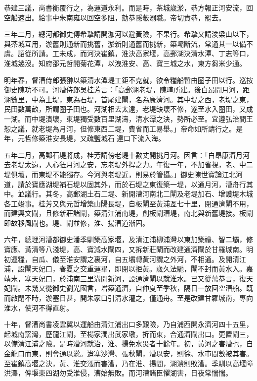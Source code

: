 恭建三議，尚書衡覆行之，為運道永利。而是時，茶城歲淤，恭方報正河安流，回空船速出。給事中朱南雍以回空多阻，劾恭隱蔽溺職。帝切責恭，罷去。

三年二月，總河都御史傅希摯請開泇河以避黃險，不果行。希摯又請浚梁山以下，與茶城互用，淤舊則通新而挑舊，淤新則通舊而挑新，築壩斷流，常通其一以備不虞。詔從所請。工未成，而河決崔鎮，淮決高家堰，高郵湖決清水潭、丁志等口，淮城幾沒。知府邵元哲開菊花潭，以洩淮安、高、寶三城之水，東方芻米少通。

明年春，督漕侍郎張翀以築清水潭堤工鉅不克就，欲令糧船暫由圈子田以行。巡按御史陳功不可。河漕侍郎吳桂芳言：「高郵湖老堤，陳瑄所建。後白昂開月河，距湖數里，中為土堤，東為石堤，首尾建閘，名為康濟河。其中堤之西，老堤之東，民田數萬畝，所謂圈子田也。河湖相去太遠，老堤缺壞不修，遂至水入圈田，又成一湖。而中堤潰壞，東堤獨受數百里湖濤，清水潭之決，勢所必至。宜遵弘治間王恕之議，就老堤為月河，但修東西二堤，費省而工易舉。」帝命如所請行之。是年，元哲修築淮安長堤，又疏鹽城石達口下流入海。

五年二月，高郵石堤將成，桂芳請傍老堤十數丈開挑月河。因言：「白昂康濟月河去老堤太遠，人心狃月河之安，忘老堤外捍之力。年復一年，不加省視，老、中二堤俱壞，而東堤不能獨存。今河與老堤近，則易於管攝。」御史陳世寶論江北河道，請於寶應湖堤補石堤以固其外，而於石堤之東復築一堤，以通月河，漕舟行其中。並議行。其冬，高郵湖土石二堤、新開漕河南北二閘及老堤加石、增護堤木城各工竣事。桂芳又與元哲增築山陽長堤，自板閘至黃浦亙七十里，閉通濟閘不用，而建興文閘，且修新莊諸閘，築清江浦南堤，創板閘漕堤，南北與新舊堤接。板閘即故移風閘也。堤、閘並修，淮、揚漕道漸固。

六年，總理河漕都御史潘季馴築高家堰，及清江浦柳浦灣以東加築禮、智二壩，修寶應、黃清等八淺堤，高、寶減水閘四，又拆新莊閘而改建通濟閘於甘羅城南。明初運糧，自瓜、儀至淮安謂之裏河，自五壩轉黃河謂之外河，不相通。及開清江浦，設閘天妃口，春夏之交重運畢，即閉以拒黃。歲久法馳，閘不封而黃水入。嘉靖末，塞天妃口，於浦南三里溝開新河，設通濟閘以就淮水。已又從萬恭言，復天妃閘。未幾又從御史劉光國言，增築通濟，自仲夏至季秋，隔日一放回空漕船。既而啟閉不時，淤塞日甚，開朱家口引清水灌之，僅通舟。至是改建甘羅城南，專向淮水，使河不得直射。

十年，督漕尚書凌雲翼以運船由清江浦出口多艱險，乃自浦西開永濟河四十五里，起城南窯灣，歷龍江閘，至楊家澗出武家墩，折而東，合通濟閘出口。更置閘三，以備清江浦之險。是時漕河就治，淮、揚免水災者十餘年。初，黃河之害漕也，自金龍口而東，則會通以淤。迨塞沙灣、張秋閘，漕以安，則徐、水市間數被其害。至崔鎮高堰之決，黃、淮交漲而害漕，乃在淮、揚間，湖潰則敗漕。季馴以高堰障洪澤，俾堰東四湖勿受淮侵，漕始無敗。而河漕諸臣懼湖害，日夜常惴惴。

